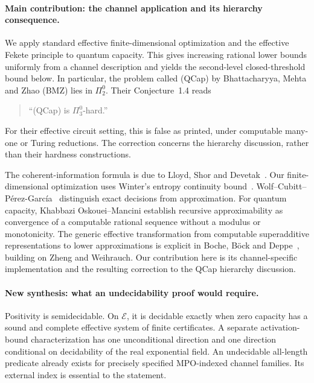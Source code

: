 \paragraph{Main contribution: the channel application and its hierarchy consequence.}
We apply standard effective finite-dimensional optimization and the
effective Fekete principle to quantum capacity. This gives increasing
rational lower bounds uniformly from a channel description and yields
the second-level closed-threshold bound below.
In particular, the problem called (QCap) by Bhattacharyya,
Mehta and Zhao (BMZ) lies in $\Pi^0_2$. Their Conjecture~1.4 reads
\begin{quote}
``(QCap) is $\Pi^0_3$-hard.''
\end{quote}
For their effective circuit setting, this is false as printed, under
computable many-one or Turing reductions. The correction concerns the
hierarchy discussion, rather than their hardness constructions.

\begin{remark}
The coherent-information formula is due to Lloyd, Shor and
Devetak~\cite{Lloyd,Shor,Devetak}. Our finite-dimensional optimization
uses Winter's entropy continuity bound~\cite{Winter}.
Wolf--Cubitt--P\'erez-Garc\'ia~\cite{WCPG} distinguish exact decisions from
approximation. For quantum capacity, Khabbazi Oskouei--Mancini
\cite[Theorem~4.1]{OM} establish recursive approximability as convergence
of a computable rational sequence without a modulus or monotonicity.
The generic effective transformation from computable superadditive
representations to lower approximations is explicit in Boche, B\"ock and
Deppe~\cite[Lemmas~17--19 and Theorem~21]{BBD}, building on Zheng and
Weihrauch. Our contribution here is its channel-specific implementation
and the resulting correction to the QCap hierarchy discussion.
\end{remark}

\paragraph{New synthesis: what an undecidability proof would require.}
Positivity is semidecidable. On $\mathcal E$, it is decidable exactly when
zero capacity has a sound and complete effective system of finite
certificates. A separate activation-bound characterization has one
unconditional direction and one direction conditional on decidability of
the real exponential field. An undecidable all-length predicate already
exists for precisely specified MPO-indexed channel families. Its external
index is essential to the statement.

